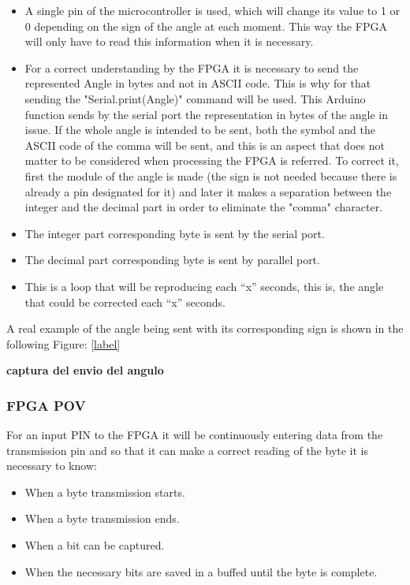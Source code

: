\begin{itemize}	
	\item A single pin of the microcontroller is used, which will change its value to 1 or 0 depending on the sign of the angle at each moment. This way the FPGA will only have to read this information when it is necessary.
	
	\item For a correct understanding by the FPGA it is necessary to send the represented Angle in bytes and not in ASCII code. This is why for that sending the "Serial.print(Angle)" command will be used. This Arduino function sends by the serial port the representation in bytes of the angle in issue.\newline
	If the whole angle is intended to be sent, both the symbol and the ASCII code of the comma will be sent, and this is an aspect that does not matter to be considered when processing the FPGA is referred. To correct it, first the module of the angle is made (the sign is not needed because there is already a pin designated for it) and later it makes a separation between the integer and the decimal part in order to eliminate the "comma" character.
	\item The integer part corresponding byte is sent by the serial port.
	\item The decimal part corresponding byte is sent by parallel port.
	\item This is a loop that will be reproducing each “x” seconds, this is, the angle that could be corrected each “x” seconds. 
\end{itemize}
A real example of the angle being sent with its corresponding sign is shown in the following Figure: \ref{label}

\textbf{captura del envio del angulo}

\subsubsection{FPGA POV} \label{sec:vista_fpga}

For an input PIN to the FPGA it will be continuously entering data from the transmission pin and so that it can make a correct reading of the byte it is necessary to know: 

\begin{itemize}
	\item When a byte transmission starts.
	\item When a byte transmission ends.
	\item When a bit can be captured. 
	\item When the necessary bits are saved in a buffed until the byte is complete.
\end{itemize}

